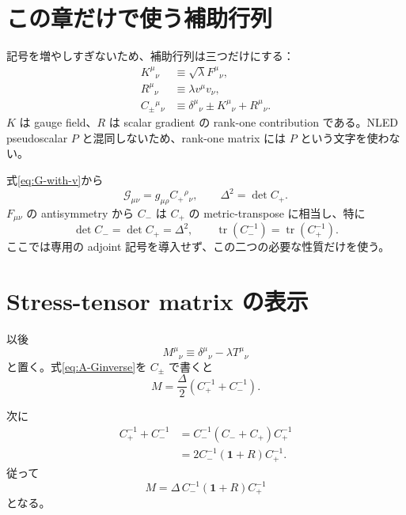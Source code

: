\documentclass[a4paper,11pt]{ltjsreport}
\newcommand{\tr}{\operatorname{tr}}
\newcommand{\G}{\mathcal G}
\newcommand{\Id}{\mathbf 1}
\begin{document}
\section{この章だけで使う補助行列}

記号を増やしすぎないため、補助行列は三つだけにする：
\begin{align}
 K^\mu{}_{\nu}&\equiv\sqrt\lambda F^\mu{}_{\nu},
 \label{eq:Kdef}\\
 R^\mu{}_{\nu}&\equiv\lambda v^\mu v_\nu,
 \label{eq:Rdef}\\
 C_\pm{}^\mu{}_{\nu}&\equiv
 \delta^\mu{}_{\nu}\pm K^\mu{}_{\nu}+R^\mu{}_{\nu}.
 \label{eq:Cpm}
\end{align}
$K$ は gauge field、$R$ は scalar gradient の rank-one contribution である。NLED pseudoscalar $P$ と混同しないため、rank-one matrix には $P$ という文字を使わない。

式\eqref{eq:G-with-v}から
\begin{equation}
 \G_{\mu\nu}=g_{\mu\rho}C_+{}^\rho{}_{\nu},
 \qquad
 \Delta^2=\det C_+.
 \label{eq:G-Cplus}
\end{equation}
$F_{\mu\nu}$ の antisymmetry から $C_-$ は $C_+$ の metric-transpose に相当し、特に
\begin{equation}
 \det C_- =\det C_+ =\Delta^2,
 \qquad
 \tr(C_-^{-1})=\tr(C_+^{-1}).
 \label{eq:Cpm-det-tr}
\end{equation}
ここでは専用の adjoint 記号を導入せず、この二つの必要な性質だけを使う。

\section{Stress-tensor matrix の表示}

以後
\begin{equation}
 M^\mu{}_{\nu}\equiv\delta^\mu{}_{\nu}-\lambda T^\mu{}_{\nu}
 \label{eq:Adef-note}
\end{equation}
と置く。式\eqref{eq:A-Ginverse}を $C_\pm$ で書くと
\begin{equation}
 M=\frac{\Delta}{2}\left(C_+^{-1}+C_-^{-1}\right).
 \label{eq:A-average}
\end{equation}

次に
\begin{align}
 C_+^{-1}+C_-^{-1}
 &=C_-^{-1}(C_-+C_+)C_+^{-1}\\
 &=2C_-^{-1}(\Id+R)C_+^{-1}.
\end{align}
従って
\begin{equation}
 M=\Delta\,C_-^{-1}(\Id+R)C_+^{-1}
 \label{eq:A-factor}
\end{equation}
となる。
\end{document}
